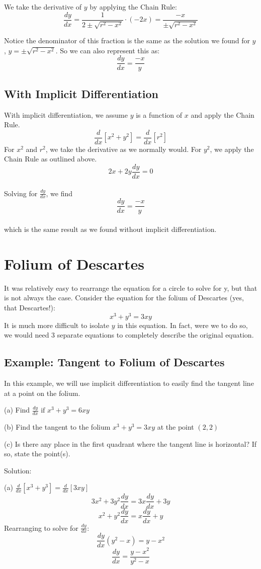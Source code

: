 We take the derivative of $y$ by applying the Chain Rule:
$$\frac{dy}{dx}=\frac{1}{2 \pm \sqrt{r^2 - x^2}} \cdot (- 2x) = 
\frac{-x}{\pm \sqrt{r^2 - x^2}}$$ 

Notice the denominator of this fraction is the same as the solution 
we found for $y$, $y=\pm \sqrt{r^2-x^2}$. So we can also represent 
this as: $$\frac{dy}{dx}=\frac{-x}{y}$$

\subsection{With Implicit Differentiation}
With implicit differentiation, we assume $y$ is a function of $x$ and 
apply the Chain Rule. $$\frac{d}{dx}[x^2+y^2]=\frac{d}{dx}[r^2]$$ For 
$x^2$ and $r^2$, we take the derivative as we normally would. For 
$y^2$, we apply the Chain Rule as outlined above. 
$$2x+2y\frac{dy}{dx}=0$$\\ Solving for $\frac{dy}{dx}$, we find 
$$\frac{dy}{dx}=\frac{-x}{y}$$ \\which is the same result as we found 
without implicit differentiation. 

\section{Folium of Descartes}
It was relatively easy to rearrange the equation for a circle to 
solve for y, but that is not always the case. Consider the equation 
for the folium of Descartes (yes, that Descartes!): $$x^3+y^3=3xy$$ 
It is much more difficult to isolate $y$ in this equation. In fact, 
were we to do so, we would need 3 separate equations to completely 
describe the original equation. 

\subsection{Example: Tangent to Folium of Descartes}

In this example, we will use implicit differentiation to easily find 
the tangent line at a point on the folium. 

(a) Find $\frac{dy}{dx} \text{ if } x^3+y^3 = 6xy$

(b) Find the tangent to the folium $x^3+y^3=3xy$ at the point $(2, 2)$

(c) Is there any place in the first quadrant where the tangent line 
is horizontal? If so, state the point(s). 

Solution:

(a) $\frac{d}{dx}[x^3+y^3]=\frac{d}{dx}[3xy]$
$$3x^2+3y^2\frac{dy}{dx}=3x\frac{dy}{dx}+3y$$
$$x^2+y^2\frac{dy}{dx}=x\frac{dy}{dx}+y$$
Rearranging to solve for $\frac{dy}{dx}$:
$$\frac{dy}{dx}(y^2-x)=y-x^2$$
$$\frac{dy}{dx}=\frac{y-x^2}{y^2-x}$$

